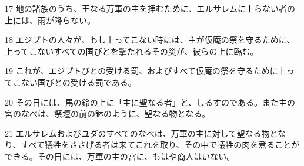 \par 17 地の諸族のうち、王なる万軍の主を拝むために、エルサレムに上らない者の上には、雨が降らない。
\par 18 エジプトの人々が、もし上ってこない時には、主が仮庵の祭を守るために、上ってこないすべての国びとを撃たれるその災が、彼らの上に臨む。
\par 19 これが、エジプトびとの受ける罰、およびすべて仮庵の祭を守るために上ってこない国びとの受ける罰である。
\par 20 その日には、馬の鈴の上に「主に聖なる者」と、しるすのである。また主の宮のなべは、祭壇の前の鉢のように、聖なる物となる。
\par 21 エルサレムおよびユダのすべてのなべは、万軍の主に対して聖なる物となり、すべて犠牲をささげる者は来てこれを取り、その中で犠牲の肉を煮ることができる。その日には、万軍の主の宮に、もはや商人はいない。


